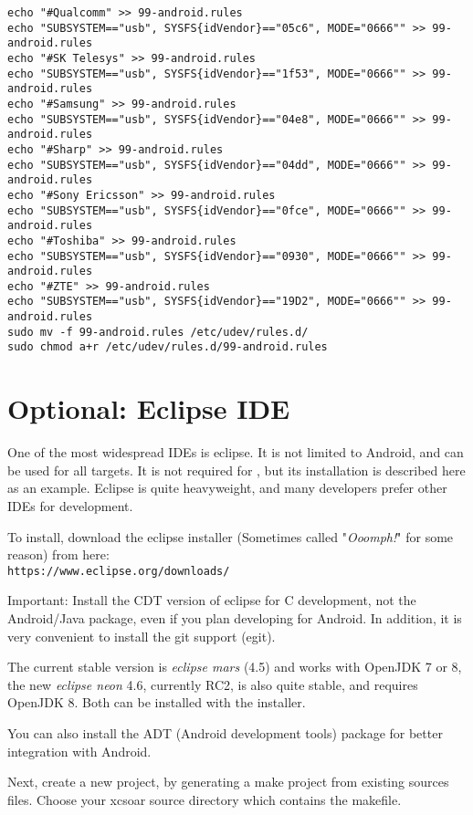 \begin{maxipage}
\begin{verbatim}
echo "#Qualcomm" >> 99-android.rules
echo "SUBSYSTEM=="usb", SYSFS{idVendor}=="05c6", MODE="0666"" >> 99-android.rules
echo "#SK Telesys" >> 99-android.rules
echo "SUBSYSTEM=="usb", SYSFS{idVendor}=="1f53", MODE="0666"" >> 99-android.rules
echo "#Samsung" >> 99-android.rules
echo "SUBSYSTEM=="usb", SYSFS{idVendor}=="04e8", MODE="0666"" >> 99-android.rules
echo "#Sharp" >> 99-android.rules
echo "SUBSYSTEM=="usb", SYSFS{idVendor}=="04dd", MODE="0666"" >> 99-android.rules
echo "#Sony Ericsson" >> 99-android.rules
echo "SUBSYSTEM=="usb", SYSFS{idVendor}=="0fce", MODE="0666"" >> 99-android.rules
echo "#Toshiba" >> 99-android.rules
echo "SUBSYSTEM=="usb", SYSFS{idVendor}=="0930", MODE="0666"" >> 99-android.rules
echo "#ZTE" >> 99-android.rules
echo "SUBSYSTEM=="usb", SYSFS{idVendor}=="19D2", MODE="0666"" >> 99-android.rules
sudo mv -f 99-android.rules /etc/udev/rules.d/
sudo chmod a+r /etc/udev/rules.d/99-android.rules
\end{verbatim}
\end{maxipage}

\section{Optional: Eclipse IDE}
One of the most widespread IDEs is eclipse. It is not limited to Android, and can be used for all targets. It is not required for \xc, but its installation is described here as an example. Eclipse is quite heavyweight, and many developers prefer other IDEs for \xc development.

To install, download the eclipse installer (Sometimes called "\emph{Ooomph!}" for some reason) from here:\\
\texttt{https://www.eclipse.org/downloads/}

Important: Install the CDT version of eclipse for C development, not the Android/Java package, even if you plan developing for Android. In addition, it is very convenient to install the git support (egit).

The current stable version is \emph{eclipse mars} (4.5) and works with OpenJDK 7 or 8, the new \emph{eclipse neon} 4.6, currently RC2, is also quite stable, and requires OpenJDK 8. Both can be installed with the installer.

You can also install the ADT (Android development tools) package for better integration with Android.

Next, create a new project, by generating a make project from existing sources files. Choose your xcsoar source directory which contains the makefile.

